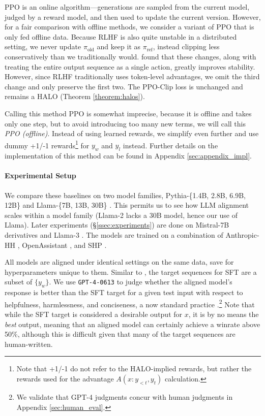 \begin{enumerate}
    PPO is an online algorithm---generations are sampled from the current model, judged by a reward model, and then used to update the current version. 
    However, for a fair comparison with offline methods, we consider a variant of PPO that is only fed offline data.
    Because RLHF is also quite unstable in a distributed setting, we never update $\pi_\text{old}$ and keep it as $\pi_\text{ref}$, instead clipping less conservatively than we traditionally would.
    \citet{baheti2023improving} found that these changes, along with treating the entire output sequence as a single action, greatly improves stability. 
    However, since RLHF traditionally uses token-level advantages, we omit the third change and only preserve the first two.
    The PPO-Clip loss is unchanged and remains a HALO (Theorem \ref{theorem:halos}).
    
    Calling this method PPO is somewhat imprecise, because it is offline and takes only one step, but to avoid introducing too many new terms, we will call this \textit{PPO (offline)}.
    Instead of using learned rewards, we simplify even further and use dummy +1/-1 rewards\footnote{Note that +1/-1 do not refer to the HALO-implied rewards, but rather the rewards used for the advantage $A(x{:}y_{<t}, y_t)$ calculation.} for $y_w$ and $y_l$ instead.
    Further details on the implementation of this method can be found in Appendix \ref{sec:appendix_impl}.
\end{enumerate}

\paragraph{Experimental Setup} We compare these baselines on two model families, Pythia-\{1.4B, 2.8B, 6.9B, 12B\} \citep{biderman2023pythia} and Llama-\{7B, 13B, 30B\} \citep{touvron2023llama}.
This permits us to see how LLM alignment scales within a model family (Llama-2 lacks a 30B model, hence our use of Llama).
Later experiments (\S\ref{ssec:experiments}) are done on Mistral-7B derivatives \citep{jiang2023mistral} and Llama-3 \citep{dubey2024llama}.
The models are trained on a combination of Anthropic-HH \citep{ganguli2022red}, OpenAssistant \citep{kopf2023openassistant}, and SHP \citep{pmlr-v162-ethayarajh22a}.

All models are aligned under identical settings on the same data, save for hyperparameters unique to them.
Similar to \citet{rafailov2023direct}, the target sequences for SFT are a subset of $\{y_w\}$.
We use \texttt{GPT-4-0613} to judge whether the aligned model’s response is better than the SFT target for a given test input with respect to helpfulness, harmlessness, and conciseness, a now standard practice \citep{zheng2023judging,alpaca_eval}.\footnote{We validate that GPT-4 judgments concur with human judgments in Appendix \ref{sec:human_eval}.}
Note that while the SFT target is considered a desirable output for $x$, it is by no means the \textit{best} output, meaning that an aligned model can certainly achieve a winrate above 50\%, although this is difficult given that many of the target sequences are human-written.

